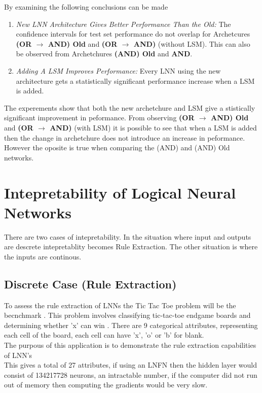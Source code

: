 By examining the following conclusions can be made
\begin{enumerate}
	\item \textit{New LNN Architecture Gives Better Performance Than the Old:} The confidence intervals for test set performance do not overlap for Archetcures \textbf{(OR $\rightarrow$ AND) Old} and \textbf{(OR $\rightarrow$ AND)} (without LSM). This can also be observed from Archetchures \textbf{(AND) Old} and \textbf{AND}.
	
	\item \textit{Adding A LSM Improves Performance:} Every LNN using the new architecture gets a statistically significant performance increase when a LSM is added.
\end{enumerate}

The experements show that both the new archetchure and LSM give a stistically significant improvement in peformance. From observing \textbf{(OR $\rightarrow$ AND) Old} and \textbf{(OR $\rightarrow$ AND)} (with LSM) it is possible to see that when a LSM is added then the change in archetchure does not introduce an increase in peformance. However the oposite is true when comparing the (AND) and (AND) Old networks.

\section{Intepretability of Logical Neural Networks}
There are two cases of intepretability. In the situation where input and outputs are descrete intepretablity becomes Rule Extraction. The other situation is where the inputs are continous.

\subsection{Discrete Case (Rule Extraction)}
To assess the rule extraction of LNNs the Tic Tac Toe problem will be the becnchmark \cite{Lichman:2013}. This problem involves classifying tic-tac-toe endgame boards and determining whether 'x' can win . There are 9 categorical attributes, representing each cell of the board, each cell can have 'x', 'o' or 'b' for blank.\\

The purpous of this application is to demonstrate the rule extraction capabilities of LNN's\\

This gives a total of 27 attributes, if using an LNFN then the hidden layer would consist of 134217728 neurons, an intractable number, if the computer did not run out of memory then computing the gradients would be very slow.

